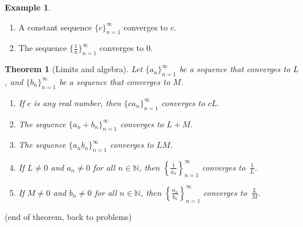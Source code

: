 \documentclass[12pt]{amsart}
\newcommand{\N}{\mathbb{N}}
\numberwithin{equation}{section}
\theoremstyle{plain} %
\newtheorem{thm}[equation]{Theorem}
\theoremstyle{definition}
\newtheorem{ex}[equation]{Example}
\theoremstyle{remark}
\begin{document}
\begin{ex}
\begin{enumerate}
\item A constant sequence $\{c\}_{n=1}^\infty$ converges to $c$.
\item The sequence $\{\frac{1}{n}\}_{n=1}^\infty$ converges to $0$.
\end{enumerate}
\end{ex}


\begin{thm}[Limits and algebra]\label{thm99}
Let $\{a_n\}_{n=1}^\infty$ be a sequence that converges to $L$, and $\{b_n\}_{n=1}^\infty$ be a sequence that converges to $M$.
\begin{enumerate}
\item If $c$ is any real number, then $\{ c a_n\}_{n=1}^\infty$ converges to $cL$.
\item The sequence $\{a_n + b_n\}_{n=1}^\infty$ converges to $L+M$.
\item The sequence $\{a_n b_n\}_{n=1}^\infty$ converges to $LM$.
\item If $L\neq 0$ and $a_n\neq 0$ for all $n\in \N$, then $\displaystyle\left\{\frac{1}{a_n}\right\}_{n=1}^\infty$\!\!\! converges to~$\displaystyle \frac{1}{L}$.
\item If $M\neq 0$ and $b_n\neq 0$ for all $n\in \N$, then $\displaystyle\left\{\frac{a_n}{b_n}\right\}_{n=1}^\infty$\!\!\! converges to~$\displaystyle \frac{L}{M}$.
\end{enumerate}
\end{thm}
(end of theorem, back to problems)
\end{document}
